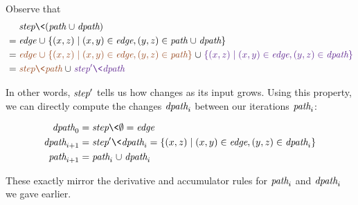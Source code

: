 \noindent
Observe that
%
\begin{align*}
  &\mathrel{\hphantom{=}} \name{step} \<(\colorpath \cup \colordpath)
  \\
  &= \name{edge} \cup \setfor{(x,z)}{(x,y) \in \name{edge}, (y,z) \in \colorpath \cup \colordpath}
  \\
  &= {\colorA \name{edge} \cup \setfor{(x,z)}{(x,y) \in \name{edge}, (y,z) \in \colorpath}} \cup {\colorB \setfor{(x,z)}{(x,y) \in \name{edge}, (y,z) \in \colordpath}}
  \\
  &= {\colorA\name{step}\<\colorpath} \cup {\colorB\name{step}'\<\colordpath}
\end{align*}

\noindent
In other words, $\text{\itshape step}'$ tells us how  changes as its input
grows.
%
Using this property, we can directly compute the changes $\text{\itshape dpath}_i$
between our iterations $\text{\itshape path}_i$:



\begin{align*}
  \name{dpath}_0
  &= \name{step}\<\emptyset
  = \name{edge}
  \\
  \name{dpath}_{i+1}
  &= \name{step}'\<\name{dpath}_i
  = \setfor{(x,z)}{(x,y) \in \name{edge}, (y,z) \in \name{dpath}_i}
  \\
  \name{path}_{i+1}
  &= \name{path}_i \cup \name{dpath}_i
\end{align*}

\noindent These exactly mirror the derivative and accumulator rules for
\(\text{\itshape path}_i\) and \(\text{\itshape dpath}_i\) we gave earlier.



